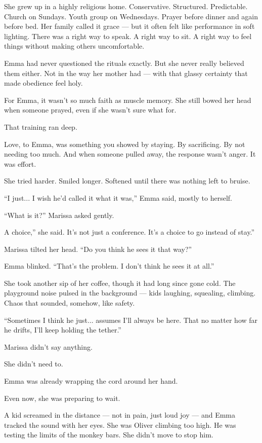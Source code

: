 She grew up in a highly religious home. Conservative. Structured. Predictable.
Church on Sundays. Youth group on Wednesdays. Prayer before dinner and again before bed.
Her family called it grace — but it often felt like performance in soft lighting.
There was a right way to speak. A right way to sit. A right way to feel things without making others uncomfortable.

Emma had never questioned the rituals exactly.
But she never really believed them either.
Not in the way her mother had — with that glassy certainty that made obedience feel holy.

For Emma, it wasn’t so much faith as muscle memory.
She still bowed her head when someone prayed, even if she wasn’t sure what for.

That training ran deep.

Love, to Emma, was something you showed by staying. By sacrificing.
By not needing too much.
And when someone pulled away, the response wasn’t anger.
It was effort.

She tried harder. Smiled longer. Softened until there was nothing left to bruise.

``I just... I wish he’d called it what it was,'' Emma said, mostly to herself.

``What is it?'' Marissa asked gently.

A choice,'' she said. It’s not just a conference. It’s a choice to go instead of stay.''

Marissa tilted her head. ``Do you think he sees it that way?''

Emma blinked. ``That’s the problem. I don’t think he sees it at all.''

She took another sip of her coffee, though it had long since gone cold.
The playground noise pulsed in the background — kids laughing, squealing, climbing.
Chaos that sounded, somehow, like safety.

``Sometimes I think he just... assumes I’ll always be here. That no matter how far he drifts, I’ll keep holding the tether.''

Marissa didn’t say anything.

She didn’t need to.

Emma was already wrapping the cord around her hand.

Even now, she was preparing to wait.

A kid screamed in the distance --- not in pain, just loud joy --- and Emma tracked the sound with her eyes. 
She was Oliver climbing too high. 
He was testing the limits of the monkey bars. 
She didn't move to stop him.

